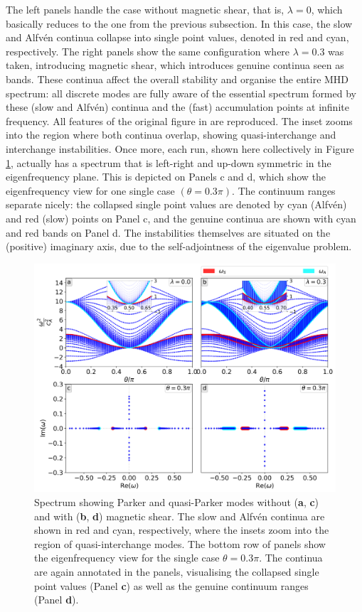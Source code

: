 The left panels handle the case without magnetic shear, that is, $\lambda = 0$, which basically reduces to the one from the previous subsection. In this case, the slow and Alfv\'en continua collapse into single point values, denoted in red and cyan, respectively. The right panels show the same configuration where $\lambda = 0.3$ was taken, introducing magnetic shear, which introduces genuine continua seen as bands. These continua affect the overall stability and organise the entire MHD spectrum: all discrete modes are fully aware of the essential spectrum formed by these (slow and Alfv\'en) continua and the (fast) accumulation points at infinite frequency. All features of the original figure in \citet{book_MHD} are reproduced. The inset zooms into the region where both continua overlap, showing quasi-interchange and interchange instabilities. Once more, each run, shown here collectively in Figure \ref{fig: quasi_parker}, actually has a spectrum that is left-right and up-down symmetric in the eigenfrequency plane. This is depicted on Panels c and d, which show the eigenfrequency view for one single case $(\theta = 0.3\pi)$. The continuum ranges separate nicely: the collapsed single point values are denoted by cyan (Alfv\'en) and red (slow) points on Panel c, and the genuine continua are shown with cyan and red bands on Panel d. The instabilities themselves are situated on the (positive) imaginary axis, due to the self-adjointness of the eigenvalue problem.

\begin{figure}[t]
  \centering
  \includegraphics[width=\textwidth]{quasi_parker.png}
  \caption{
    Spectrum showing Parker and quasi-Parker modes without (\textbf{a}, \textbf{c}) and with (\textbf{b}, \textbf{d}) magnetic shear. The slow and Alfv\'en continua are shown in red and cyan, respectively, where the insets zoom into the region of quasi-interchange modes. The bottom row of panels show the eigenfrequency view for the single case $\theta = 0.3\pi$. The continua are again annotated in the panels, visualising the collapsed single point values (Panel \textbf{c}) as well as the genuine continuum ranges (Panel \textbf{d}).
  }
  \label{fig: quasi_parker}
\end{figure}

